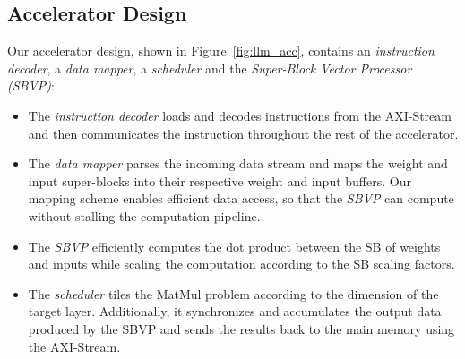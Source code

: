 


\subsection{Accelerator Design}

Our accelerator design, shown in Figure~\ref{fig:llm_acc}, contains an \emph{instruction decoder}, a \emph{data mapper}, a \emph{scheduler} and the \emph{Super-Block Vector Processor (SBVP)}:

\begin{itemize}
    \item The \emph{instruction decoder} loads and decodes instructions from the AXI-Stream and then communicates the instruction throughout the rest of the accelerator.
    
    \item The \emph{data mapper} parses the incoming data stream and maps the weight and input super-blocks into their respective weight and input buffers. 
    Our mapping scheme enables efficient data access, so that the \emph{SBVP} can compute without stalling the computation pipeline.
    
    \item The \emph{SBVP} efficiently computes the dot product between the SB of weights and inputs while scaling the computation according to the SB scaling factors.

    \item The \emph{scheduler} tiles the MatMul problem according to the dimension of the target layer. %
    Additionally, it synchronizes and accumulates the output data produced by the SBVP and sends the results back to the main memory using the AXI-Stream.
\end{itemize}






